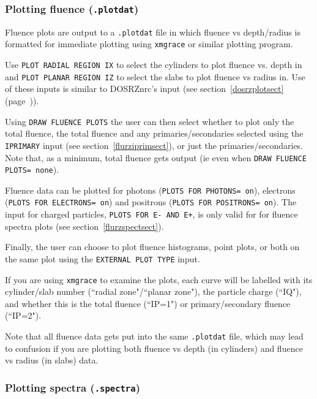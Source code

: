 \documentclass[12pt,twoside]{article}  %
\newcommand{\lpage}[1]{(page~\pageref{#1})}
\begin{document}
\subsubsection{Plotting fluence ({\tt .plotdat})}
\label{flurzfluencesect}

Fluence plots are output to a {\tt .plotdat} file in which fluence
vs depth/radius is formatted for immediate plotting using {\tt xmgrace} or similar
plotting program.

Use {\tt PLOT RADIAL REGION IX} to select the cylinders to plot
fluence vs. depth in and {\tt PLOT PLANAR REGION IZ} to select the slabs
to plot fluence vs radius in.  Use of these inputs is similar to DOSRZnrc's
input (see section~\ref{dosrzplotsect}\lpage{dosrzplotsect}).

Using {\tt DRAW FLUENCE PLOTS} the user can then select whether to plot
only the total fluence, the total fluence and any primaries/secondaries
selected using the {\tt IPRIMARY} input (see section~\ref{flurziprimsect}),
or just the primaries/secondaries.  Note that, as a minimum, total fluence
gets output (ie even when {\tt DRAW FLUENCE PLOTS= none}).

Fluence data can be plotted for photons ({\tt PLOTS FOR PHOTONS= on}),
electrons ({\tt PLOTS FOR ELECTRONS= on}) and positrons
({\tt PLOTS FOR POSITRONS= on}).  The input for charged particles,
{\tt PLOTS FOR E- AND E+}, is only valid for for fluence spectra plots
(see section~\ref{flurzspectsect}). 

Finally, the user can choose to plot fluence histograms, point plots, or
both on the same plot using the {\tt EXTERNAL PLOT TYPE} input.

If you are using {\tt xmgrace} to examine the plots, each curve will be labelled
with its cylinder/slab number (``radial zone"/``planar zone"), the 
particle charge (``IQ"), and whether this is
the total fluence (``IP=1") or primary/secondary fluence (``IP=2").  

Note that all fluence data gets put into the same {\tt .plotdat} file, which
may lead to confusion if you are plotting both fluence vs depth (in
cylinders) and fluence
vs radius (in slabs) data.

\subsubsection{Plotting spectra ({\tt .spectra})}
\label{flurzspectsect}
\end{document}
